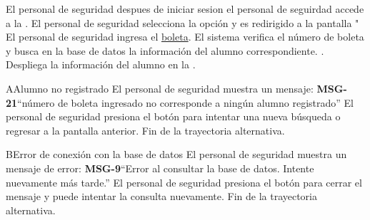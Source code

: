 \begin{UCtrayectoria}
	\UCpaso[\UCactor] El personal de seguridad despues de iniciar sesion el personal de seguirdad accede a la .
	\UCpaso[\UCactor] El personal de seguridad selecciona la opción  y es redirigido a la pantalla "
	\UCpaso[\UCactor] El personal de seguridad ingresa el \hyperlink{Alumno.boleta}{boleta}.
	\UCpaso El sistema verifica el número de boleta y busca en la base de datos la información del alumno correspondiente. .
	\UCpaso Despliega la información del alumno en la .
\end{UCtrayectoria}
\begin{UCtrayectoriaA}{A}{Alumno no registrado}
	\UCpaso[\UCactor] El personal de seguridad muestra un mensaje: {\bf MSG-21}{``número de boleta ingresado no corresponde a ningún alumno registrado''}
	\UCpaso[\UCactor] El personal de seguridad presiona el botón  para intentar una nueva búsqueda o regresar a la pantalla anterior.
	\UCpaso Fin de la trayectoria alternativa.
\end{UCtrayectoriaA}

\begin{UCtrayectoriaA}{B}{Error de conexión con la base de datos}
	\UCpaso[\UCactor] El personal de seguridad muestra un mensaje de error: {\bf MSG-9}{``Error al consultar la base de datos. Intente nuevamente más tarde.''}
	\UCpaso[\UCactor] El personal de seguridad presiona el botón  para cerrar el mensaje y puede intentar la consulta nuevamente.
	\UCpaso Fin de la trayectoria alternativa.
\end{UCtrayectoriaA}

